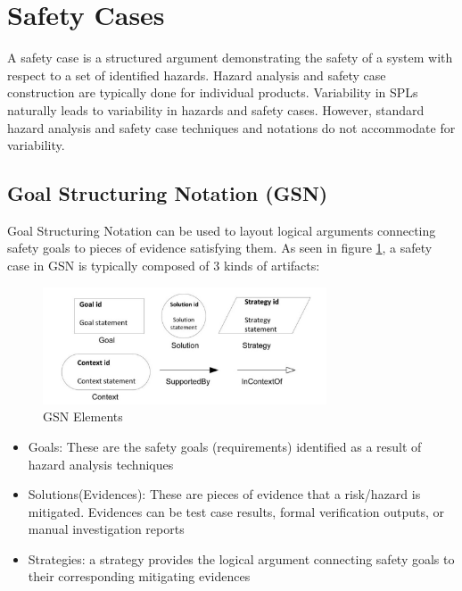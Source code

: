 \documentclass[11pt]{article}
\begin{document}
\section{Safety Cases}

A safety case is a structured argument demonstrating the safety of a system with respect to a set of identified hazards. Hazard analysis and safety case construction are typically done for individual products. Variability in SPLs naturally leads to variability in hazards and safety cases. However, standard hazard analysis and safety case techniques and notations do not accommodate for variability. 
 
\subsection{Goal Structuring Notation (GSN)}

Goal Structuring Notation \cite{Kelly} can be used to layout logical arguments connecting safety goals to pieces of evidence satisfying them. As seen in figure \ref{fig:gsn}, a safety case in GSN is typically composed of 3 kinds of artifacts:

\begin{figure}
  \centering
  \includegraphics[width=0.75\textwidth]{gsn}
  \caption{GSN Elements}
  \label{fig:gsn}
\end{figure}

\begin{itemize}
\item Goals: These are the safety goals (requirements) identified as a result of hazard analysis techniques
\item Solutions(Evidences): These are pieces of evidence that a risk/hazard is mitigated. Evidences can be test case results, formal verification outputs, or manual investigation reports
\item Strategies: a strategy provides the logical argument connecting safety goals to their corresponding mitigating evidences
\end{itemize}
\end{document}
